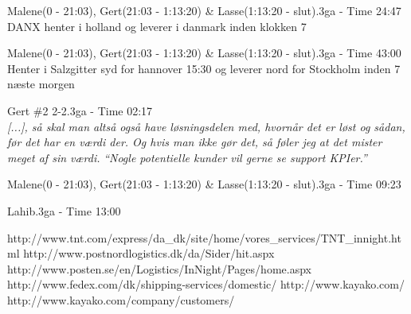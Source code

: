 \begin{thebibliography}{9}

	Malene(0 - 21:03), Gert(21:03 - 1:13:20) \& Lasse(1:13:20 - slut).3ga - Time 24:47
	DANX henter i holland og leverer i danmark inden klokken 7

	Malene(0 - 21:03), Gert(21:03 - 1:13:20) \& Lasse(1:13:20 - slut).3ga - Time 43:00
Henter i Salzgitter syd for hannover 15:30 og leverer nord for Stockholm inden 7 næste morgen

	Gert \#2 2-2.3ga - Time 02:17\\
	\textit{[...], så skal man altså også have løsningsdelen med, hvornår det er løst og sådan, før det har en værdi der. Og hvis man ikke gør det, så føler jeg at det mister meget af sin værdi.}
	\textit{“Nogle potentielle kunder vil gerne se support KPIer.”}

	Malene(0 - 21:03), Gert(21:03 - 1:13:20) \& Lasse(1:13:20 - slut).3ga - Time 09:23

	Lahib.3ga - Time 13:00

	http://www.tnt.com/express/da\_dk/site/home/vores\_services/TNT\_innight.html
	http://www.postnordlogistics.dk/da/Sider/hit.aspx
	http://www.posten.se/en/Logistics/InNight/Pages/home.aspx
	http://www.fedex.com/dk/shipping-services/domestic/
	http://www.kayako.com/
	http://www.kayako.com/company/customers/


\end{thebibliography}
